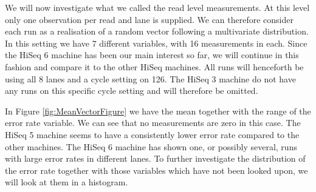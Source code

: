 \documentclass[a4paper,11pt,fleqn,twoside,notitlepage]{report}
\begin{document}
We will now investigate what we called the read level measurements. At this level only one observation per read and lane is supplied. We can therefore consider each run as a realisation of a random vector following a multivariate distribution. In this setting we have 7 different variables, with 16 measurements in each. Since the HiSeq 6 machine has been our main interest so far, we will continue in this fashion and compare it to the other HiSeq machines. All runs will henceforth be using all 8 lanes and a cycle setting on 126. The HiSeq 3 machine do not have any runs on this specific cycle setting and will therefore be omitted.

In Figure \ref{fig:MeanVectorFigure} we have the mean together with the range of the error rate variable. We can see that no measurements are zero in this case. The HiSeq 5 machine seems to have a consistently lower error rate compared to the other machines. The HiSeq 6 machine has shown one, or possibly several, runs with large error rates in different lanes. To further investigate the distribution of the error rate together with those variables which have not been looked upon, we will look at them in a histogram.  
\end{document}
